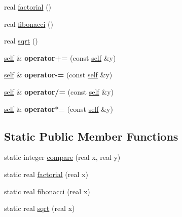 \begin{DoxyCompactItemize}
\item 
real \hyperlink{classez_1_1objects_1_1Real_a3fde204357baf3d2b681bca4407550ec}{factorial} ()
\item 
real \hyperlink{classez_1_1objects_1_1Real_a121a4202e18d893429c5216a42883bb2}{fibonacci} ()
\item 
real \hyperlink{classez_1_1objects_1_1Real_abb95328dc5b8fa45590968bf8f91ae9b}{sqrt} ()
\item 
\mbox{\label{classez_1_1objects_1_1Real_aba162b198dafe558f04c30e7686e1f39}} 
\hyperlink{classez_1_1objects_1_1Real}{self} \& {\bfseries operator+=} (const \hyperlink{classez_1_1objects_1_1Real}{self} \&y)
\item 
\mbox{\label{classez_1_1objects_1_1Real_aa1c7b262135e4e2f36c430bcc2013eb4}} 
\hyperlink{classez_1_1objects_1_1Real}{self} \& {\bfseries operator-\/=} (const \hyperlink{classez_1_1objects_1_1Real}{self} \&y)
\item 
\mbox{\label{classez_1_1objects_1_1Real_a904c94f6f00702446ae7661f92a8dc4d}} 
\hyperlink{classez_1_1objects_1_1Real}{self} \& {\bfseries operator/=} (const \hyperlink{classez_1_1objects_1_1Real}{self} \&y)
\item 
\mbox{\label{classez_1_1objects_1_1Real_a3ccae4b73e3894bc7fb67cfbf525b5fd}} 
\hyperlink{classez_1_1objects_1_1Real}{self} \& {\bfseries operator$\ast$=} (const \hyperlink{classez_1_1objects_1_1Real}{self} \&y)
\end{DoxyCompactItemize}
\subsection*{Static Public Member Functions}
\begin{DoxyCompactItemize}
\item 
static integer \hyperlink{classez_1_1objects_1_1Real_ae4f22d945b157de3bde39c0535930502}{compare} (real x, real y)
\item 
static real \hyperlink{classez_1_1objects_1_1Real_a320dda2159c26b94293767e33f89de91}{factorial} (real x)
\item 
static real \hyperlink{classez_1_1objects_1_1Real_aaf98cb65719546ff7aa8833d08bfbace}{fibonacci} (real x)
\item 
static real \hyperlink{classez_1_1objects_1_1Real_a0262710806e8acf0cd731736abd40c73}{sqrt} (real x)
\end{DoxyCompactItemize}
